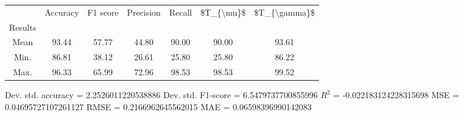 \begin{tabular}{|c|c|c|c|c|c|c|}
\toprule
{} &  Accuracy &  F1 score &  Precision &  Recall &  \$T\_\{\textbackslash mu\}\$ &  \$T\_\{\textbackslash gamma\}\$ \\
Results &           &           &            &         &            &               \\
\hline
Mean    &     93.44 &     57.77 &      44.80 &   90.00 &      90.00 &         93.61 \\
Min.    &     86.81 &     38.12 &      26.61 &   25.80 &      25.80 &         86.22 \\
Max.    &     96.33 &     65.99 &      72.96 &   98.53 &      98.53 &         99.52 \\
\bottomrule
\end{tabular}

 Dev. std. accuracy = 2.2526011220538886
 Dev. std. F1-score = 6.5479737700855996
 $R^2$ = -0.022183124228315698
 MSE = 0.04695727107261127
 RMSE = 0.2166962645562015
 MAE = 0.06598396990142083